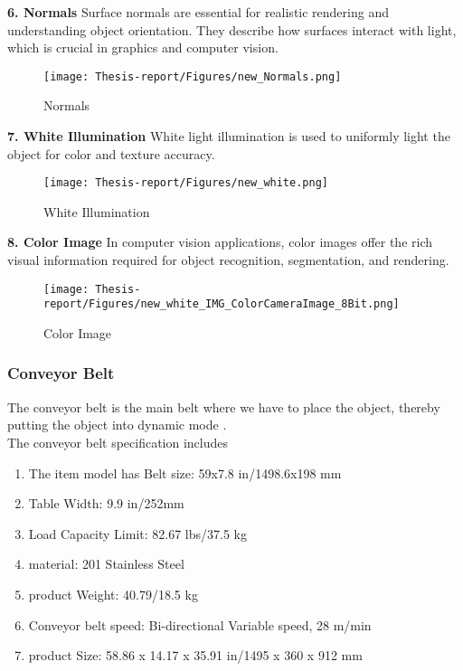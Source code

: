 \documentclass[12pt]{article}
\begin{document}
\noindent\textbf{6. Normals} Surface normals are essential for realistic rendering and understanding object orientation. They describe how surfaces interact with light, which is crucial in graphics and computer vision.
\begin{figure}[H]
    \centering
    \texttt{[image: Thesis-report/Figures/new\_Normals.png]}
    \caption{Normals}
    \label{fig:normals}
\end{figure}

\noindent\textbf{7. White Illumination} White light illumination is used to uniformly light the object for color and texture accuracy.
\begin{figure}[H]
    \centering
    \texttt{[image: Thesis-report/Figures/new\_white.png]}
    \caption{White Illumination}
    \label{fig:white}
\end{figure}

\noindent\textbf{8. Color Image} In computer vision applications, color images offer the rich visual information required for object recognition, segmentation, and rendering.
\begin{figure}[H]
    \centering
    \texttt{[image: Thesis-report/Figures/new\_white\_IMG\_ColorCameraImage\_8Bit.png]}
    \caption{Color Image}
    \label{fig:color_image}
\end{figure}
\newpage
\subsubsection{Conveyor Belt}

The conveyor belt is the main belt where we have to place the object, thereby putting the object into dynamic mode \cite{ref22}. \\

The conveyor belt specification includes\\
\begin{enumerate}
    \item The item model has Belt size: 59x7.8 in/1498.6x198 mm \cite{ref22}
    \item Table Width: 9.9 in/252mm \cite{ref22}
    \item Load Capacity Limit: 82.67 lbs/37.5 kg \cite{ref22}
    \item material: 201 Stainless Steel \cite{ref22}
    \item product Weight: 40.79/18.5 kg \cite{ref22}
    \item Conveyor belt speed: Bi-directional Variable speed, 28 m/min \cite{ref22}
    \item product Size: 58.86 x 14.17 x 35.91 in/1495 x 360 x 912 mm \cite{ref22}
\end{enumerate}
\end{document}
